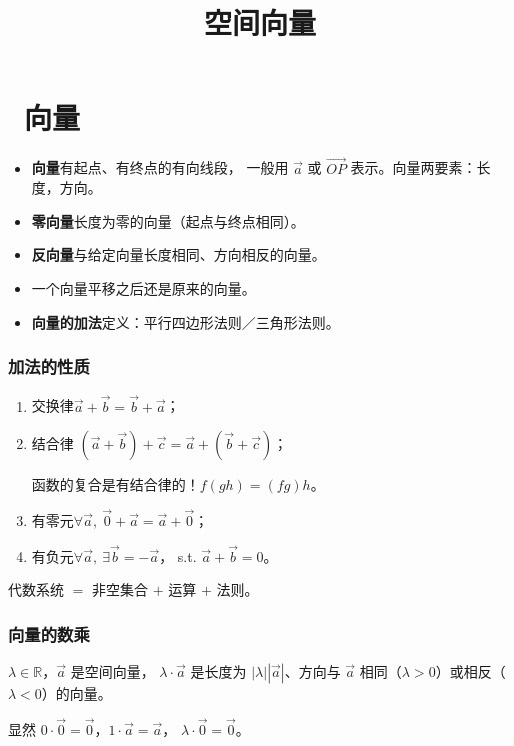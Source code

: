 \documentclass[UTF8,11pt]{ctexart}
\title{空间向量}
\date{}
\theoremstyle{cnthm}
\begin{document}
\maketitle

\section{\ 向量}

\begin{itemize}
\item \textbf{向量}\quad 有起点、有终点的有向线段，
一般用 $\vec a$ 或 $\overrightarrow{OP}$ 表示。向量两要素：长度，方向。
\item \textbf{零向量}\quad 长度为零的向量（起点与终点相同）。
\item \textbf{反向量}\quad 与给定向量长度相同、方向相反的向量。
\item 一个向量平移之后还是原来的向量。
\item \textbf{向量的加法}\quad 定义：平行四边形法则／三角形法则。
\end{itemize}

\subsubsection*{加法的性质}

\begin{enumerate}
\item 交换律\quad $\vec a+\vec b=\vec b+\vec a$；
\item 结合律\quad
$(\vec a+\vec b)+\vec c=\vec a+(\vec b+\vec c)$；

函数的复合是有结合律的！$f(gh)=(fg)h$。

\item 有零元\quad $\forall\vec a,\
\vec 0+\vec a=\vec a+\vec 0$；
\item 有负元\quad $\forall\vec a,\ \exists\vec b=-\vec a$，
s.t. $\vec a+\vec b=0$。
\end{enumerate}

代数系统 $=$ 非空集合 $+$ 运算 $+$ 法则。

\subsubsection*{向量的数乘}

$\lambda\in\mathbb R$，$\vec a$ 是空间向量，
$\lambda\cdot\vec a$ 是长度为 $|\lambda||\vec a|$、方向与 $\vec a$
相同（$\lambda>0$）或相反（$\lambda<0$）的向量。

显然 $0\cdot\vec 0=\vec 0$，$1\cdot\vec a=\vec a$，
$\lambda\cdot\vec 0=\vec 0$。
\end{document}
